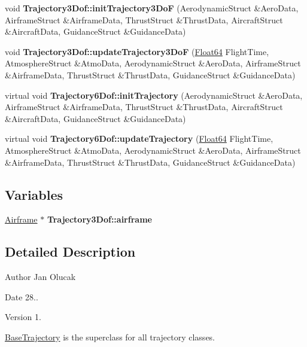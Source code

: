 \begin{DoxyCompactItemize}
\mbox{\label{group___trajectory_ga9f2ffccf491db97fca6554e91a12acbb}} 
void {\bfseries Trajectory3\+Dof\+::init\+Trajectory3\+DoF} (Aerodynamic\+Struct \&Aero\+Data, Airframe\+Struct \&Airframe\+Data, Thrust\+Struct \&Thrust\+Data, Aircraft\+Struct \&Aircraft\+Data, Guidance\+Struct \&Guidance\+Data)
\item 
\mbox{\label{group___trajectory_ga49c456a78c4edcf51d5913110831f365}} 
void {\bfseries Trajectory3\+Dof\+::update\+Trajectory3\+DoF} (\hyperlink{group___tools_ga3f1431cb9f76da10f59246d1d743dc2c}{Float64} Flight\+Time, Atmosphere\+Struct \&Atmo\+Data, Aerodynamic\+Struct \&Aero\+Data, Airframe\+Struct \&Airframe\+Data, Thrust\+Struct \&Thrust\+Data, Guidance\+Struct \&Guidance\+Data)
\item 
\mbox{\label{group___trajectory_ga06450e7f25b1ab5035a52bd7c48f3c7e}} 
virtual void {\bfseries Trajectory6\+Dof\+::init\+Trajectory} (Aerodynamic\+Struct \&Aero\+Data, Airframe\+Struct \&Airframe\+Data, Thrust\+Struct \&Thrust\+Data, Aircraft\+Struct \&Aircraft\+Data, Guidance\+Struct \&Guidance\+Data)
\item 
\mbox{\label{group___trajectory_ga329b18a91ab09a26a90adbbf71be9305}} 
virtual void {\bfseries Trajectory6\+Dof\+::update\+Trajectory} (\hyperlink{group___tools_ga3f1431cb9f76da10f59246d1d743dc2c}{Float64} Flight\+Time, Atmosphere\+Struct \&Atmo\+Data, Aerodynamic\+Struct \&Aero\+Data, Airframe\+Struct \&Airframe\+Data, Thrust\+Struct \&Thrust\+Data, Guidance\+Struct \&Guidance\+Data)
\end{DoxyCompactItemize}
\subsection*{Variables}
\begin{DoxyCompactItemize}
\item 
\mbox{\label{group___trajectory_ga3e03844efae98d54d2bacd66d808312e}} 
\hyperlink{group___airframe_class_airframe}{Airframe} $\ast$ {\bfseries Trajectory3\+Dof\+::airframe}
\end{DoxyCompactItemize}


\subsection{Detailed Description}
\begin{DoxyAuthor}{Author}
Jan Olucak 
\end{DoxyAuthor}
\begin{DoxyDate}{Date}
28.. 
\end{DoxyDate}
\begin{DoxyVersion}{Version}
1.
\end{DoxyVersion}
\hyperlink{group___trajectory_class_base_trajectory}{Base\+Trajectory} is the superclass for all trajectory classes. 

